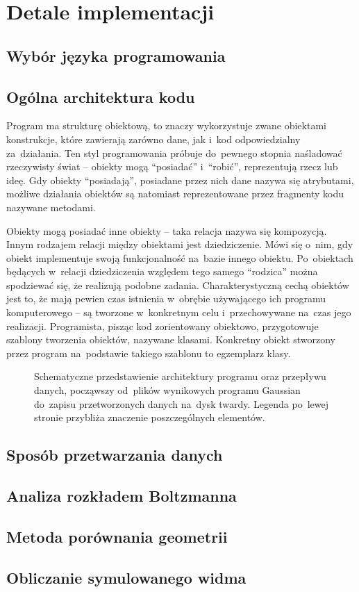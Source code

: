 \section{Detale implementacji}\label{tesliper:implementation}
\subsection{Wybór języka programowania}\label{implementation:language}
\subsection{Ogólna architektura kodu}\label{implementation:architecture}
Program \tesliper ma strukturę obiektową, to znaczy wykorzystuje zwane obiektami konstrukcje,
  które zawierają zarówno dane, jak i~kod odpowiedzialny za~działania.
Ten styl programowania próbuje do~pewnego stopnia naśladować rzeczywisty świat \---
  obiekty mogą \enquote{posiadać} i~\enquote{robić}, reprezentują rzecz lub ideę.
Gdy obiekty \enquote{posiadają}, posiadane przez nich dane nazywa się atrybutami,
  możliwe działania obiektów są natomiast reprezentowane przez fragmenty kodu nazywane metodami.

Obiekty mogą posiadać inne obiekty \--- taka relacja nazywa się kompozycją.
Innym rodzajem relacji między obiektami jest dziedziczenie.
Mówi się o~nim, gdy obiekt implementuje swoją funkcjonalność na~bazie innego obiektu.
Po~obiektach będących w~relacji dziedziczenia względem tego samego \enquote{rodzica}
  można spodziewać się, że realizują podobne zadania.
Charakterystyczną cechą obiektów jest to, że mają pewien czas istnienia w~obrębie używającego
  ich programu komputerowego \--- są tworzone w~konkretnym celu i~przechowywane na~czas
  jego realizacji.
Programista, pisząc kod zorientowany obiektowo, przygotowuje szablony tworzenia obiektów,
  nazywane klasami.
Konkretny obiekt stworzony przez program na~podstawie takiego szablonu to egzemplarz klasy.

\begin{figure}
  
  \caption{
    Schematyczne przedstawienie architektury programu \tesliper{} oraz przepływu danych,
      począwszy od~plików wynikowych programu Gaussian do~zapisu przetworzonych danych
      na~dysk twardy.
    Legenda po~lewej stronie przybliża znaczenie poszczególnych elementów.
  }
  \label{fig:class-diagram}
\end{figure}
\subsection{Sposób przetwarzania danych}\label{implementation:parsing}
\subsection{Analiza rozkładem Boltzmanna}\label{implementation:boltzmann}
\subsection{Metoda porównania geometrii}\label{implementation:rmsd}
\subsection{Obliczanie symulowanego widma}\label{implementation:spectra}
